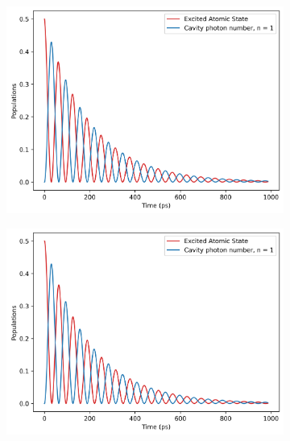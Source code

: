 \documentclass[12pt]{article}
\begin{document}
\begin{figure}[H]
    \centering
    \begin{subfigure}{0.45\textwidth}
        \centering
        \includegraphics[width=\linewidth]{Research Project/Code/results/JCM/OQS_Pop_Spont_eg.png}
        \caption{}
        \label{fig:JCM_OQS_Pop_Spont_eg}
    \end{subfigure}
    \hfill
    \begin{subfigure}{0.45\textwidth}
        \centering
        \includegraphics[width=\linewidth]{Research Project/Code/results/JCM/OQS_Pop_Therm_eg.png}
        \caption{}
        \label{fig:JCM_OQS_Pop_Therm_eg}
    \end{subfigure}
    

\end{figure}
\end{document}
